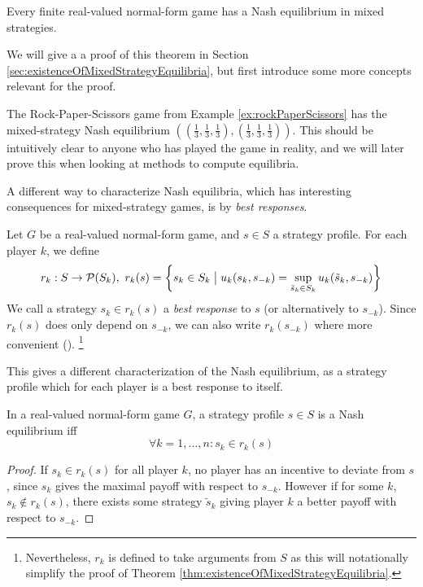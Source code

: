 \documentclass[a4paper]{scrreprt}
\begin{document}
    \begin{thm}
        Every finite real-valued normal-form game has a Nash equilibrium in mixed strategies.
        \label{thm:existenceOfMixedStrategyEquilibria}
    \end{thm}
    We will give a a proof of this theorem in Section \ref{sec:existenceOfMixedStrategyEquilibria}, but first introduce some more concepts relevant for the proof.
    
    \begin{ex} %
        The Rock-Paper-Scissors game from Example \ref{ex:rockPaperScissors}
        has the mixed-strategy Nash equilibrium $((\frac{1}{3}, \frac{1}{3}, \frac{1}{3}), (\frac{1}{3}, \frac{1}{3}, \frac{1}{3}))$.
        This should be intuitively clear to anyone who has played the game in reality, and we will later prove this when looking at methods to compute equilibria.
    \end{ex}
    
    A different way to characterize Nash equilibria, which has interesting consequences for mixed-strategy games, is by \emph{best responses}.
    
    \begin{defn}
        Let $G$ be a real-valued normal-form game, and $s \in S$ a strategy profile. For each player $k$, we define 
        \[
            r_k: S \to \operatorname{\mathcal{P}}(S_k),~ r_k(s) = \biggl\{s_k \in S_k \bigm\vert u_k(s_k, s_{-k}) = \sup_{\tilde{s}_k \in S_k} u_k(\tilde{s}_k, s_{-k}) \biggr\}
        \]
        We call a strategy $s_k \in r_k(s)$ a \emph{best response} to $s$ (or alternatively to $s_{-k}$).
        Since $r_k(s)$ does only depend on $s_{-k}$, we can also write $r_k(s_{-k})$ where more convenient (\cite{bib:fudenbergGameTheory}).
        \footnote{Nevertheless, $r_k$ is defined to take arguments from $S$ as this will notationally simplify the proof of Theorem \ref{thm:existenceOfMixedStrategyEquilibria}.}
    \end{defn}
    
    This gives a different characterization of the Nash equilibrium, as a strategy profile which for each player is a best response to itself.
    
    \begin{thm}
        In a real-valued normal-form game $G$, a strategy profile $s \in S$ is a Nash equilibrium iff 
        \[
            \forall k = 1, \dots, n: s_k \in r_k(s)
        \]
        \label{thm:nashEquilibriumCharacterizationByBestResponses}
    \end{thm}
    \begin{proof}
        If $s_k \in r_k(s)$ for all player $k$, no player has an incentive to deviate from $s$, since $s_k$ gives the maximal payoff with respect to $s_{-k}$.
        However if for some $k$, $s_k \notin r_k(s)$, there exists some strategy $\tilde{s}_k$ giving player $k$ a better payoff with respect to $s_{-k}$.
    \end{proof}
\end{document}
